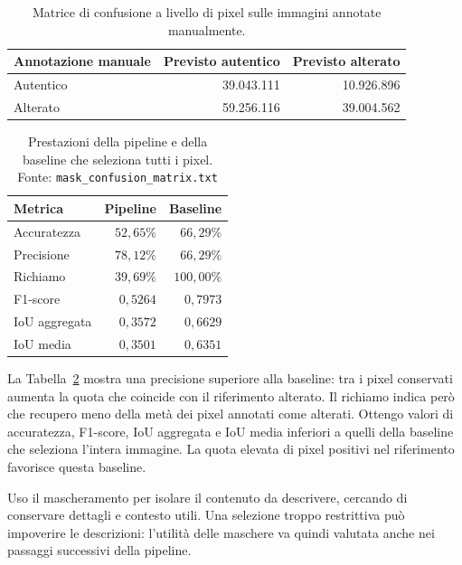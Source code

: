 \begin{table}[htbp]
    \centering
    \small
    \caption{Matrice di confusione a livello di pixel sulle immagini annotate manualmente.}
    \label{tab:risultati-maschere-confusione}
    \begin{tabular}{@{}lrr@{}}
        \toprule
        Annotazione manuale & Previsto autentico & Previsto alterato \\
        \midrule
        Autentico & 39.043.111 & 10.926.896 \\
        Alterato & 59.256.116 & 39.004.562 \\
        \bottomrule
    \end{tabular}
\end{table}

\begin{table}
    \centering
    \small
    \caption{Prestazioni della pipeline e della baseline che seleziona tutti i pixel. Fonte: \texttt{mask\_confusion\_matrix.txt}}
    \label{tab:risultati-maschere-metriche}
    \begin{tabular}{@{}lrr@{}}
        \toprule
        Metrica & Pipeline & Baseline \\
        \midrule
        Accuratezza & $52{,}65\%$ & $66{,}29\%$ \\
        Precisione & $78{,}12\%$ & $66{,}29\%$ \\
        Richiamo & $39{,}69\%$ & $100{,}00\%$ \\
        F1-score & $0{,}5264$ & $0{,}7973$ \\
        IoU aggregata & $0{,}3572$ & $0{,}6629$ \\
        IoU media & $0{,}3501$ & $0{,}6351$ \\
        \bottomrule
    \end{tabular}
\end{table}

\newpage
La Tabella~\ref{tab:risultati-maschere-metriche} mostra una precisione superiore alla baseline: tra i pixel conservati aumenta la quota che coincide con il riferimento alterato. Il richiamo indica però che recupero meno della metà dei pixel annotati come alterati. Ottengo valori di accuratezza, F1-score, IoU aggregata e IoU media inferiori a quelli della baseline che seleziona l'intera immagine. La quota elevata di pixel positivi nel riferimento favorisce questa baseline.

Uso il mascheramento per isolare il contenuto da descrivere, cercando di conservare dettagli e contesto utili. Una selezione troppo restrittiva può impoverire le descrizioni: l'utilità delle maschere va quindi valutata anche nei passaggi successivi della pipeline.

